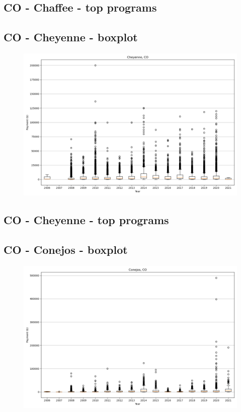 \subsection*{CO - Chaffee - top programs}

\newpage
\subsection*{CO - Cheyenne - boxplot}
\begin{figure}[h]
\centering
\includegraphics[width=7in]{../output/boxplots/counties/Cheyenne-CO_boxplot.png}
\end{figure}


\subsection*{CO - Cheyenne - top programs}

\newpage
\subsection*{CO - Conejos - boxplot}
\begin{figure}[h]
\centering
\includegraphics[width=7in]{../output/boxplots/counties/Conejos-CO_boxplot.png}
\end{figure}


